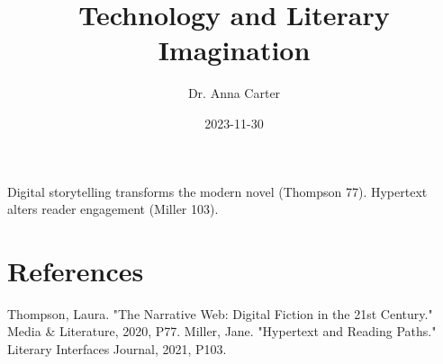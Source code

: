\documentclass{article}
\title{Technology and Literary Imagination}
\author{Dr. Anna Carter}
\date{2023-11-30}
\begin{document}
\maketitle
Digital storytelling transforms the modern novel (Thompson 77). Hypertext alters reader engagement (Miller 103).

\section{References}
Thompson, Laura. "The Narrative Web: Digital Fiction in the 21st Century." Media \& Literature, 2020, P77.
Miller, Jane. "Hypertext and Reading Paths." Literary Interfaces Journal, 2021, P103.
\end{document}
